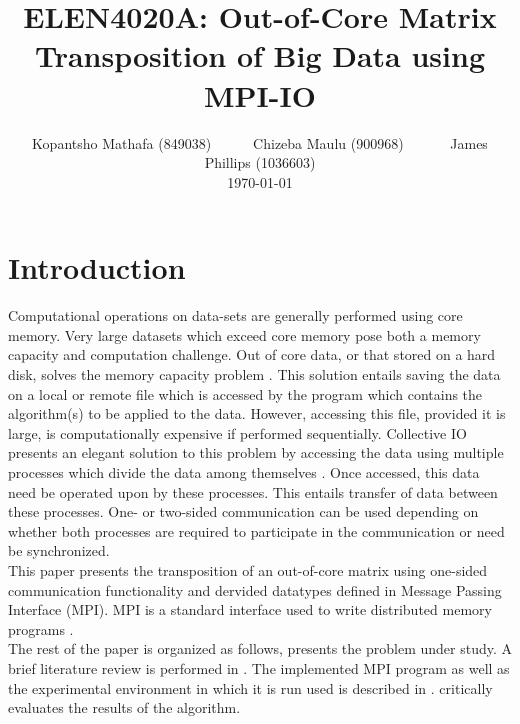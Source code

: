 \documentclass[a4paper, 11pt, twocolumn, conference]{IEEEtran}      %
\title{\LARGE \bf
ELEN4020A: Out-of-Core Matrix Transposition of Big Data using MPI-IO 
}
\author{ Kopantsho Mathafa (849038)\ \ \ \ \ \ Chizeba Maulu (900968) \ \ \ \ \ \ James Phillips (1036603) \\ \today \\
}
\begin{document}
\maketitle
\thispagestyle{plain}
\pagestyle{plain}

\section{Introduction}
Computational operations on data-sets are generally performed using core memory. Very large datasets which exceed core memory pose both a memory capacity and computation challenge. Out of core data, or that stored on a hard disk, solves the memory capacity problem \cite{8411067}. This solution entails saving the data on a local or remote file which is accessed by the program which contains the algorithm(s) to be applied to the data. However, accessing this file, provided it is large, is computationally expensive if performed sequentially. Collective IO presents an elegant solution to this problem by accessing the data using multiple processes which divide the data among themselves \cite{7152595}. Once accessed, this data need be operated upon by these processes. This entails transfer of data between these processes. One- or two-sided communication can be used depending on whether both processes are required to participate in the communication or need be synchronized. \\
This paper presents the transposition of an out-of-core matrix using one-sided communication functionality and dervided datatypes defined in Message Passing Interface (MPI). MPI is a standard interface used to write distributed memory programs \cite{1253341}. \\
The rest of the paper is organized as follows,  presents the problem under study. A brief literature review is performed in . The implemented MPI program as well as the experimental environment in which it is run used is described in .  critically evaluates the results of the algorithm. 
\end{document}
